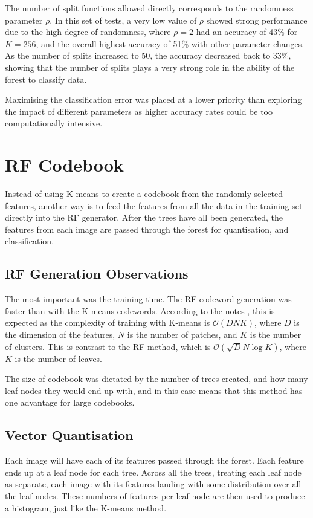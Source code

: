 \documentclass[a4paper, 10pt, conference]{ieeeconf}
\begin{document}
The number of split functions allowed directly corresponds to the randomness parameter $\rho$. In this set of tests, a very low value of $\rho$ showed strong performance due to the high degree of randomness, where $\rho = 2$ had an accuracy of 43\% for $K=256$, and the overall highest accuracy of 51\% with other parameter changes. As the number of splits increased to 50, the accuracy decreased back to 33\%, showing that the number of splits plays a very strong role in the ability of the forest to classify data.

Maximising the classification error was placed at a lower priority than exploring the impact of different parameters as higher accuracy rates could be too computationally intensive.

\section{RF Codebook}
Instead of using K-means to create a codebook from the randomly selected features, another way is to feed the features from all the data in the training set directly into the RF generator. After the trees have all been generated, the features from each image are passed through the forest for quantisation, and classification.

\subsection{RF Generation Observations}
The most important was the training time. The RF codeword generation was faster than with the K-means codewords. According to the notes \cite{notes}, this is expected as the complexity of training with K-means is $\mathcal{O}(DNK)$, where $D$ is the dimension of the features, $N$ is the number of patches, and $K$ is the number of clusters. This is contrast to the RF method, which is $\mathcal{O}(\sqrt{D}N\log{K})$, where $K$ is the number of leaves.

The size of codebook was dictated by the number of trees created, and how many leaf nodes they would end up with, and in this case means that this method has one advantage for large codebooks.

\subsection{Vector Quantisation}
Each image will have each of its features passed through the forest. Each feature ends up at a leaf node for each tree. Across all the trees, treating each leaf node as separate, each image with its features landing with some distribution over all the leaf nodes. These numbers of features per leaf node are then used to produce a histogram, just like the K-means method.
\end{document}
